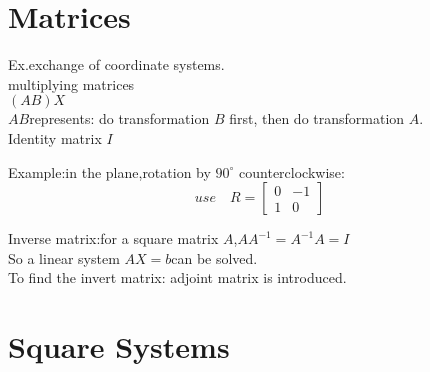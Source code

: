 \documentclass{article}
\begin{document}
\section{Matrices}
Ex.exchange of coordinate systems.\\
multiplying matrices\\
$(AB)X$\\
$AB$represents: do transformation $B$ first, then do transformation $A$.\\
Identity matrix $I$

Example:in the plane,rotation by $90^\circ$ counterclockwise:
\[use\quad R=\begin{bmatrix}
0&-1\\
1&0
\end{bmatrix}\]

Inverse matrix:for a square matrix $A$,$AA^{-1}=A^{-1}A=I$\\
So a linear system $AX=b$can be solved.\\
To find the invert matrix: adjoint matrix is introduced.
\section{Square Systems}
\end{document}
